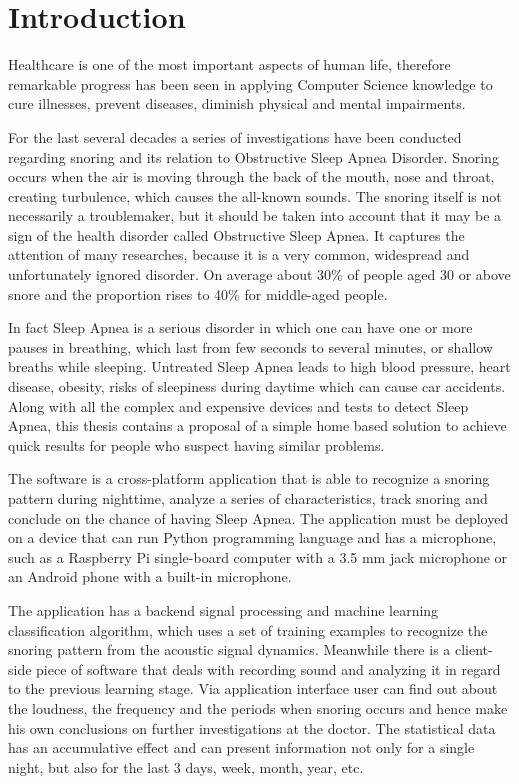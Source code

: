 \documentclass[12pt,a4paper]{report}
\begin{document}
\pagestyle{plain}
\renewcommand{\chaptername}{}

\begin{singlespacing}
\tableofcontents
\end{singlespacing}


\chapter*{Introduction}
Healthcare is one of the most important aspects of human life, therefore remarkable progress has been seen in applying Computer Science knowledge to cure illnesses, prevent diseases, diminish physical and mental impairments. 

For the last several decades a series of investigations have been conducted regarding snoring and its relation to Obstructive Sleep Apnea Disorder. Snoring occurs when the air is moving through the back of the mouth, nose and throat, creating turbulence, which causes the all-known sounds. The snoring itself is not necessarily a troublemaker, but it should be taken into account that it may be a sign of the health disorder called Obstructive Sleep Apnea. It captures the attention of many researches, because it is a very common, widespread and unfortunately ignored disorder. On average about 30\% of people aged 30 or above snore and the proportion rises to 40\% for middle-aged people.

In fact Sleep Apnea is a serious disorder in which one can have one or more pauses in breathing, which last from few seconds to several minutes, or shallow breaths while sleeping. Untreated Sleep Apnea leads to high blood pressure, heart disease, obesity, risks of sleepiness during daytime which can cause car accidents. Along with all the complex and expensive devices and tests to detect Sleep Apnea, this thesis contains a proposal of a simple home based solution to achieve quick results for people who suspect having similar problems.

The software is a cross-platform application that is able to recognize a snoring pattern during nighttime, analyze a series of characteristics, track snoring and conclude on the chance of having Sleep Apnea. The application must be deployed on a device that can run Python programming language and has a microphone, such as a Raspberry Pi single-board computer with a 3.5 mm jack microphone or an Android phone with a built-in microphone.

The application has a backend signal processing and machine learning classification algorithm, which uses a set of training examples to recognize the snoring pattern from the acoustic signal dynamics. Meanwhile there is a client-side piece of software that deals with recording sound and analyzing it in regard to the previous learning stage. Via application interface user can find out about the loudness, the frequency and the periods when snoring occurs and hence make his own conclusions on further investigations at the doctor. The statistical data has an accumulative effect and can present information not only for a single night, but also for the last 3 days, week, month, year, etc.
\end{document}
